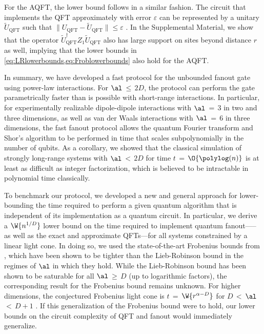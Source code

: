 For the AQFT, the lower bound follows in a similar fashion.
The circuit that implements the QFT approximately with error $\varepsilon$ can be represented by a unitary $\tilde{U}_\mathrm{QFT}$ such that $\|U_\mathrm{QFT}-\tilde {U}_\mathrm{QFT}\|\leq \varepsilon$ \cite{Cleve2000}.
In the Supplemental Material, we show that the operator $\tilde {U}_\mathrm{QFT}^\dag Z_1 \tilde {U}_\mathrm{QFT}$ also has large support on sites beyond distance $r$ as well, implying that the lower bounds in \cref{eq:LRlowerbounds,eq:Froblowerbounds} also hold for the AQFT.

In
summary, we have developed a fast protocol for the unbounded fanout gate using power-law interactions.
For $\al$\,$\le$\,$2D$, the protocol can perform the gate parametrically faster than is possible with short-range interactions.
In particular, for experimentally realizable dipole-dipole interactions with $\al$\,$=$\,$3$ in two and three dimensions, as well as van der Waals interactions with $\al$\,$=$\,$6$ in three dimensions, the fast fanout protocol allows the quantum Fourier transform and Shor's algorithm to be performed in time that scales subpolynomially in the number of qubits.
As a corollary, we showed that the classical simulation of strongly long-range systems with $\al$\,$<$\,$2D$ for time $t$\,$=$\,$\O{\polylog(n)}$ is at least as difficult as integer factorization, which is believed to be intractable in polynomial time classically.

To benchmark our protocol, we developed a new and general approach for lower-bounding the time required to perform a given quantum algorithm that is independent of its implementation as a quantum circuit.
In particular, we derive a $\W{n^{1/D}}$ lower bound on the time required to implement quantum fanout—--as well as the exact and approximate QFTs---for all systems constrained by a linear light cone.
In doing so, we used the state-of-the-art Frobenius bounds from \cite{Tran2020hierarchylinearlightcones,Kuwahara2021,Chen2021Frobenius}, which have been shown to be tighter than the Lieb-Robinson bound in the regimes of $\al$ in which they hold.
While the Lieb-Robinson bound has been shown to be saturable for all $\al$\,$\ge$\,$D$ (up to logarithmic factors), the corresponding result for the Frobenius bound remains unknown.
For higher dimensions, the conjectured Frobenius light cone is $t$\,$=$\,$\W{r^{\alpha-D}}$ for $D$\,$<$\,$\al$\,$<$\,$D+1$ \cite{Chen2021Frobenius}.
If this generalization of the Frobenius bound were to hold, our lower bounds on the circuit complexity of QFT and fanout would immediately generalize.

